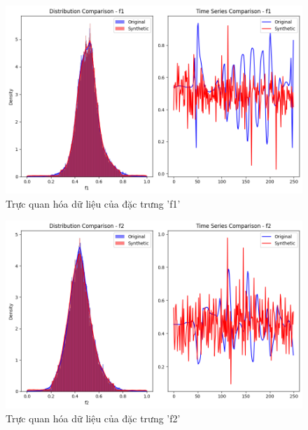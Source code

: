 \begin{figure}[H]
    \centering
    \includegraphics[width=1\textwidth]{Images/Improvement results/TimeGAN_f1.png}
    \caption{Trực quan hóa dữ liệu của đặc trưng 'f1'}
    \label{fig:timegan_data_f1}
\end{figure}

\begin{figure}[H]
    \centering
    \includegraphics[width=1\textwidth]{Images/Improvement results/TimeGAN_f2.png}
    \caption{Trực quan hóa dữ liệu của đặc trưng 'f2'}
    \label{fig:timegan_data_f2}
\end{figure}

